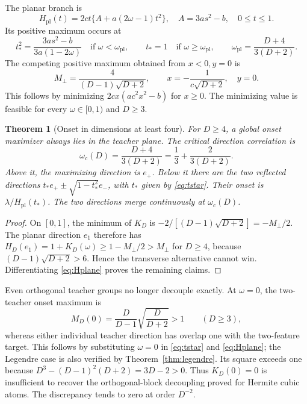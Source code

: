 \documentclass[11pt]{article}
\newtheorem{theorem}{Theorem}[section]
\theoremstyle{remark}
\begin{document}
The planar branch is
\begin{equation}\label{eq:Hplane}
 H_{\mathrm{pl}}(t)=2ct\{A+a(2\omega-1)t^2\},
 \quad A=3as^2-b,\quad 0\leq t\leq1.
\end{equation}
Its positive maximum occurs at
\begin{equation}\label{eq:tstar}
 t_*^2=\frac{3as^2-b}{3a(1-2\omega)}\quad
 \text{if }\omega<\omega_{\mathrm{pl}},\qquad
 t_*=1\quad\text{if }\omega\geq\omega_{\mathrm{pl}},
 \qquad \omega_{\mathrm{pl}}=\frac{D+4}{3(D+2)}.
\end{equation}
The competing positive maximum obtained from $x<0,y=0$ is
\begin{equation}\label{eq:transverse}
 M_\perp=\frac4{(D-1)\sqrt{D+2}},\qquad
 x=-\frac1{c\sqrt{D+2}},\quad y=0.
\end{equation}
This follows by minimizing $2cx(ac^2x^2-b)$ for $x\geq0$.
The minimizing value is feasible for every $\omega\in[0,1)$ and $D\geq3$.

\begin{theorem}[Onset in dimensions at least four]\label{thm:onset}
For $D\geq4$, a global onset maximizer always lies in the teacher plane.
The critical direction correlation is
\begin{equation}\label{eq:wc}
 \boxed{\omega_c(D)=\frac{D+4}{3(D+2)}
       =\frac13+\frac{2}{3(D+2)}.}
\end{equation}
Above it, the maximizing direction is $e_+$. Below it there are the two
reflected directions $t_*e_+\pm\sqrt{1-t_*^2}e_-$, with $t_*$ given by
\eqref{eq:tstar}. Their onset is $\lambda/H_{\mathrm{pl}}(t_*)$.
The two directions merge continuously at $\omega_c(D)$.
\end{theorem}
\begin{proof}
On $[0,1]$, the minimum of $K_D$ is
$-2/[(D-1)\sqrt{D+2}]=-M_\perp/2$. The planar direction $e_1$ therefore
has $H_D(e_1)=1+K_D(\omega)\geq1-M_\perp/2>M_\perp$ for $D\geq4$,
because $(D-1)\sqrt{D+2}>6$. Hence the transverse alternative cannot
win. Differentiating \eqref{eq:Hplane} proves the remaining claims.
\end{proof}

Even orthogonal teacher groups no longer decouple exactly. At
$\omega=0$, the two-teacher onset maximum is
\begin{equation}\label{eq:orthogonal}
 M_D(0)=\frac{D}{D-1}\sqrt{\frac D{D+2}}>1
 \qquad(D\geq3),
\end{equation}
whereas either individual teacher direction has overlap one with the
two-feature target. This follows by substituting $\omega=0$ in
\eqref{eq:tstar} and \eqref{eq:Hplane}; the Legendre case is also verified
by Theorem~\ref{thm:legendre}. Its square exceeds one because
$D^3-(D-1)^2(D+2)=3D-2>0$. Thus $K_D(0)=0$ is insufficient to recover
the orthogonal-block decoupling proved for Hermite cubic atoms. The
discrepancy tends to zero at order $D^{-2}$.
\end{document}
